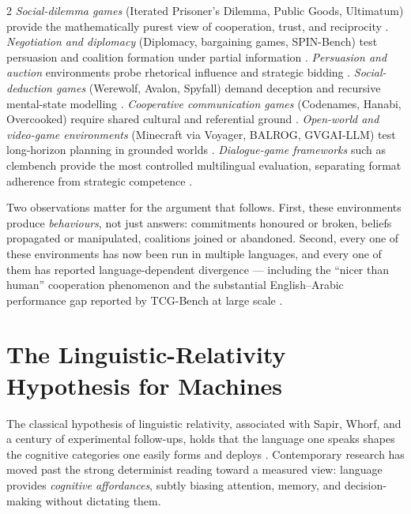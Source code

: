 \documentclass[openacc]{rsproca_new}
\begin{document}
\begin{multicols}{2}
\emph{Social-dilemma games} (Iterated Prisoner's Dilemma, Public Goods, Ultimatum) provide the mathematically purest view of cooperation, trust, and reciprocity \cite{huynh2026moreatstake, akata2025playing, buscemi2025fairgame}. \emph{Negotiation and diplomacy} (Diplomacy, bargaining games, SPIN-Bench) test persuasion and coalition formation under partial information \cite{meta2022cicero, deng2024bargaining, yao2025spinbench}. \emph{Persuasion and auction} environments probe rhetorical influence and strategic bidding \cite{biswas2025persuasion, chen2024aucarena}. \emph{Social-deduction games} (Werewolf, Avalon, Spyfall) demand deception and recursive mental-state modelling \cite{xu2023werewolf, wang2023avalon, koto2025spyfall}. \emph{Cooperative communication games} (Codenames, Hanabi, Overcooked) require shared cultural and referential ground \cite{hakimov2025codenames, chen2025llmhanabi, sun2025overcooked}. \emph{Open-world and video-game environments} (Minecraft via Voyager, BALROG, GVGAI-LLM) test long-horizon planning in grounded worlds \cite{wang2024voyager, paischer2024balrog, chen2025gvgai}. \emph{Dialogue-game frameworks} such as clembench provide the most controlled multilingual evaluation, separating format adherence from strategic competence \cite{chalamalasetti2023clembench, beyer2024clembench, schlangen2025clembench}.

Two observations matter for the argument that follows. First, these environments produce \emph{behaviours}, not just answers: commitments honoured or broken, beliefs propagated or manipulated, coalitions joined or abandoned. Second, every one of these environments has now been run in multiple languages, and every one of them has reported language-dependent divergence --- including the ``nicer than human'' cooperation phenomenon \cite{fontana2024nicer, za2026towards} and the substantial English--Arabic performance gap reported by TCG-Bench at large scale \cite{wang2025tcgbench}.

\section{The Linguistic-Relativity Hypothesis for Machines}
\label{sec:relativity}

The classical hypothesis of linguistic relativity, associated with Sapir, Whorf, and a century of experimental follow-ups, holds that the language one speaks shapes the cognitive categories one easily forms and deploys \cite{boroditsky2001does, boroditsky2011languageshapes}. Contemporary research has moved past the strong determinist reading toward a measured view: language provides \emph{cognitive affordances}, subtly biasing attention, memory, and decision-making without dictating them.


\end{multicols}
\end{document}
